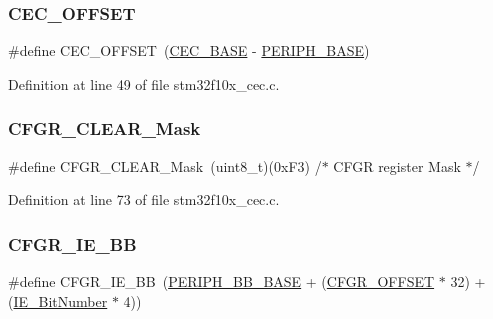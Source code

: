 \subsubsection{\texorpdfstring{C\+E\+C\+\_\+\+O\+F\+F\+S\+ET}{CEC\_OFFSET}}
{\footnotesize\ttfamily \#define C\+E\+C\+\_\+\+O\+F\+F\+S\+ET~(\hyperlink{group___peripheral__memory__map_gaacb77bc44b3f8c87ab98f241e760e440}{C\+E\+C\+\_\+\+B\+A\+SE} -\/ \hyperlink{group___peripheral__memory__map_ga9171f49478fa86d932f89e78e73b88b0}{P\+E\+R\+I\+P\+H\+\_\+\+B\+A\+SE})}



Definition at line 49 of file stm32f10x\+\_\+cec.\+c.

\mbox{\label{group___c_e_c___private___defines_gaaedf9b8df17534f5eaf75ec1ca3fbd7a}} 
\subsubsection{\texorpdfstring{C\+F\+G\+R\+\_\+\+C\+L\+E\+A\+R\+\_\+\+Mask}{CFGR\_CLEAR\_Mask}}
{\footnotesize\ttfamily \#define C\+F\+G\+R\+\_\+\+C\+L\+E\+A\+R\+\_\+\+Mask~(uint8\+\_\+t)(0x\+F3)        /$\ast$ C\+F\+G\+R register Mask $\ast$/}



Definition at line 73 of file stm32f10x\+\_\+cec.\+c.

\mbox{\label{group___c_e_c___private___defines_gac7fe35cf912353ca51a56c5f1f25b2fb}} 
\subsubsection{\texorpdfstring{C\+F\+G\+R\+\_\+\+I\+E\+\_\+\+BB}{CFGR\_IE\_BB}}
{\footnotesize\ttfamily \#define C\+F\+G\+R\+\_\+\+I\+E\+\_\+\+BB~(\hyperlink{group___peripheral__memory__map_gaed7efc100877000845c236ccdc9e144a}{P\+E\+R\+I\+P\+H\+\_\+\+B\+B\+\_\+\+B\+A\+SE} + (\hyperlink{group___r_c_c___private___defines_ga8682298330c3b9bae1992e4f1a0af985}{C\+F\+G\+R\+\_\+\+O\+F\+F\+S\+ET} $\ast$ 32) + (\hyperlink{group___c_e_c___private___defines_ga57731312db52f3498312a56e98166fad}{I\+E\+\_\+\+Bit\+Number} $\ast$ 4))}



